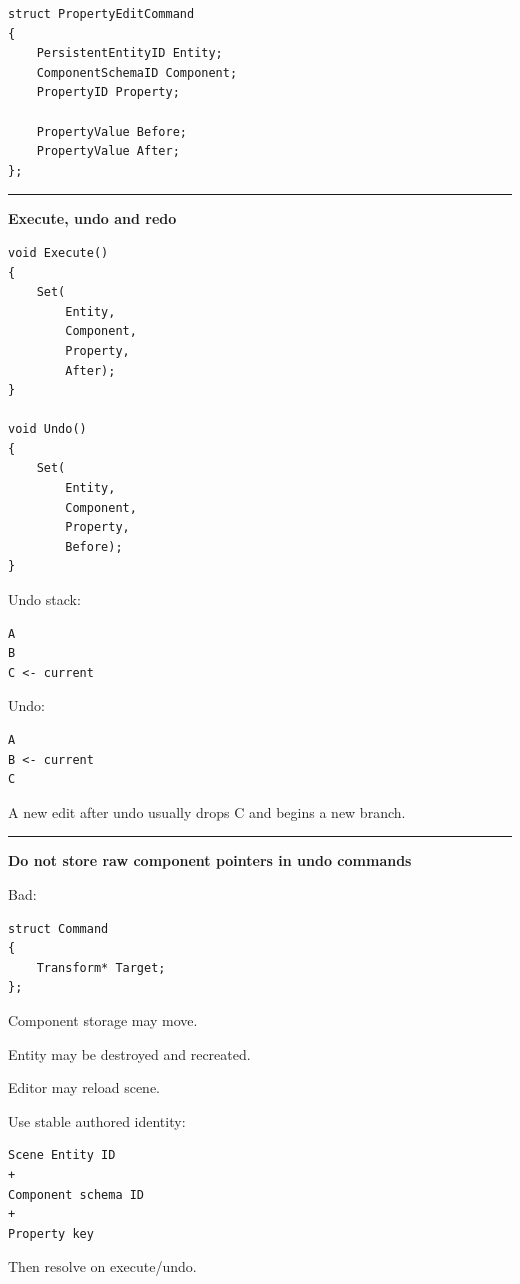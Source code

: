 \begin{verbatim}
struct PropertyEditCommand
{
    PersistentEntityID Entity;
    ComponentSchemaID Component;
    PropertyID Property;

    PropertyValue Before;
    PropertyValue After;
};
\end{verbatim}

\begin{center}\rule{0.5\linewidth}{0.5pt}\end{center}

\textbf{Execute, undo and redo}

\begin{verbatim}
void Execute()
{
    Set(
        Entity,
        Component,
        Property,
        After);
}

void Undo()
{
    Set(
        Entity,
        Component,
        Property,
        Before);
}
\end{verbatim}

Undo stack:

\begin{verbatim}
A
B
C <- current
\end{verbatim}

Undo:

\begin{verbatim}
A
B <- current
C
\end{verbatim}

A new edit after undo usually drops C and begins a new branch.

\begin{center}\rule{0.5\linewidth}{0.5pt}\end{center}

\textbf{Do not store raw component pointers in undo commands}

Bad:

\begin{verbatim}
struct Command
{
    Transform* Target;
};
\end{verbatim}

Component storage may move.

Entity may be destroyed and recreated.

Editor may reload scene.

Use stable authored identity:

\begin{verbatim}
Scene Entity ID
+
Component schema ID
+
Property key
\end{verbatim}

Then resolve on execute/undo.

